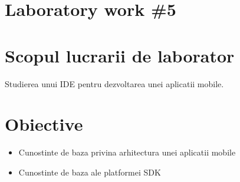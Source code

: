 \section*{Laboratory work \#5}

\section{Scopul lucrarii de laborator}
Studierea unui IDE pentru dezvoltarea unei aplicatii mobile.
\section{Obiective}

\begin{itemize}
	\item Cunostinte de baza privina arhitectura unei aplicatii mobile
	\item Cunostinte de baza ale platformei SDK
\end{itemize}




\clearpage	